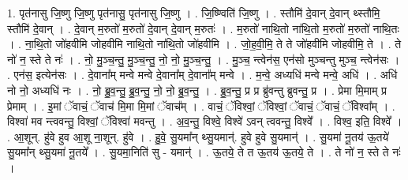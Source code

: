 \documentclass[17pt]{extarticle}
\begin{document}
1. पृत॑नासु जि॒ष्णु जि॒ष्णु पृत॑नासु॒ पृत॑नासु जि॒ष्णु । . जि॒ष्ण्विति॑ जि॒ष्णु । . स्तौमि॑ दे॒वान् दे॒वान् थ्स्तौमि॒ स्तौमि॑ दे॒वान् । . दे॒वान् म॒रुतो॑ म॒रुतो॑ दे॒वान् दे॒वान् म॒रुतः॑ । . म॒रुतो॑ नाथि॒तो ना॑थि॒तो म॒रुतो॑ म॒रुतो॑ नाथि॒तः । . ना॒थि॒तो जो॑हवीमि जोहवीमि नाथि॒तो ना॑थि॒तो जो॑हवीमि । . जो॒ह॒वी॒मि॒ ते ते जो॑हवीमि जोहवीमि॒ ते । . ते नो॑ न॒ स्ते ते नः॑ । . नो॒ मु॒ञ्च॒न्तु॒ मु॒ञ्च॒न्तु॒ नो॒ नो॒ मु॒ञ्च॒न्तु॒ । . मु॒ञ्च॒ न्त्वेन॑स॒ एन॑सो मुञ्चन्तु मुञ्च॒ न्त्वेन॑सः । . एन॑स॒ इत्येन॑सः । . दे॒वाना᳚म् मन्वे मन्वे दे॒वाना᳚म् दे॒वाना᳚म् मन्वे । . म॒न्वे॒ अध्यधि॑ मन्वे मन्वे॒ अधि॑ । . अधि॑ नो नो॒ अध्यधि॑ नः । . नो॒ ब्रु॒व॒न्तु॒ ब्रु॒व॒न्तु॒ नो॒ नो॒ ब्रु॒व॒न्तु॒ । . ब्रु॒व॒न्तु॒ प्र प्र ब्रु॑वन्तु ब्रुवन्तु॒ प्र । . प्रेमा मि॒माम् प्र प्रेमाम् । . इ॒मां ॅवाचं॒ ॅवाच॑ मि॒मा मि॒मां ॅवाच᳚म् । . वाचं॒ ॅविश्वां॒ ॅविश्वां॒ ॅवाचं॒ ॅवाचं॒ ॅविश्वा᳚म् । . विश्वा॑ मव न्त्ववन्तु॒ विश्वां॒ ॅविश्वा॑ मवन्तु । . अ॒व॒न्तु॒ विश्वे॒ विश्वे॑ ऽवन् त्ववन्तु॒ विश्वे᳚ । . विश्व॒ इति॒ विश्वे᳚ । . आ॒शून्. हु॑वे हुव आ॒शू ना॒शून्. हु॑वे । . हु॒वे॒ सु॒यमा᳚न् थ्सु॒यमान्॑. हुवे हुवे सु॒यमान्॑ । . सु॒यमा॑ नू॒तय॑ ऊ॒तये॑ सु॒यमा᳚न् थ्सु॒यमा॑ नू॒तये᳚ । . सु॒यमा॒निति॑ सु - यमान्॑ । . ऊ॒तये॒ ते त ऊ॒तय॑ ऊ॒तये॒ ते । . ते नो॑ न॒ स्ते ते नः॑ । \newline
\end{document}
